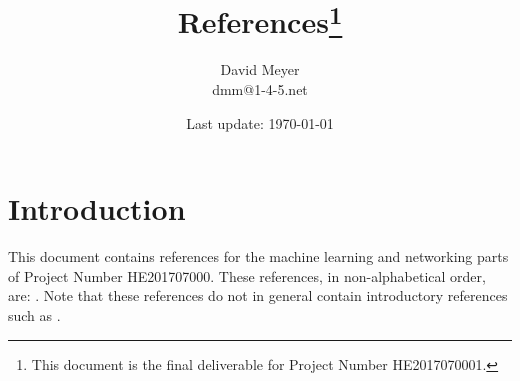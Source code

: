 \documentclass[11pt, oneside]{article}   	%
\title{References\footnote{This document is the final deliverable for Project Number HE2017070001.}}
\author{David Meyer \\
dmm@1-4-5.net}
\date{Last update: \today}							%
\begin{document}
\maketitle

\section{Introduction}
This document contains references for the machine learning and networking parts of Project Number HE201707000. These references, in non-alphabetical order, are: \cite{2018arXiv180310232I,
       2017arXiv170803074V,
       Ahuja:1990:FAS:77600.77615,
       2018arXiv180209474S,
       PhysRevLett.59.2229,
       DBLP:conf/sigcomm/GeyerC18,
       Scarselli:2009:GNN:1657477.1657482,
       2017arXiv170105923D,
       Srivastava:2014:DSW:2627435.2670313,
       Andradottir:1993:VRT:174153.174154,
       2016arXiv161101142G,
       Walraven:2016:TFO:2937770.2937891,
       2018arXiv181001257N,
       2017arXiv170908339W,
       Stampa:2017aa,
       Tao:2001aa,
       Lillicrap:2015aa,
       NIPS2015_5775,
       Peters:2011:ICG:3020548.3020617,
      2018arXiv180210031T,
      2015arXiv150602438S,
      2018arXiv180307246W,
      2016arXiv161102247G,
      oALE68a,
      Baxter:2001:IPE:1622845.1622855,
      2016arXiv161001945P,
      2016arXiv160201783M,
      2018arXiv180302811S,
      NIPS1999_1786,
      Greensmith:2004:VRT:1005332.1044710,
      2017arXiv170706347S,
      Williams1992,
      Peters:2006fk,
      Silver:2014:DPG:3044805.3044850,
      Kakade+Langford:2002,
      DBLP:journals/corr/SchulmanLMJA15,
      Schulman:2015ab,
      Schulman:2015aa,
      Goodfellow:2017aa,
      Vaswani:2017aa,
      Bahdanau:2014aa,
      GRAVES2013,
      2018arXiv180408403S,
      2017arXiv170907080S,
      2018arXiv180204240N,
      7925316,
      DBLP:journals/cm/AyoubiLSSBSR18,
      DBLP:journals/jisa/BoutabaSLASSR18,
      2018arXiv180807647P,
      2018arXiv180307976M,
      2017arXiv171203890S}.  Note that these references do not in general contain introductory references such as \cite{Sutton:1998:IRL:551283}.
      
\newpage




\end{document}
